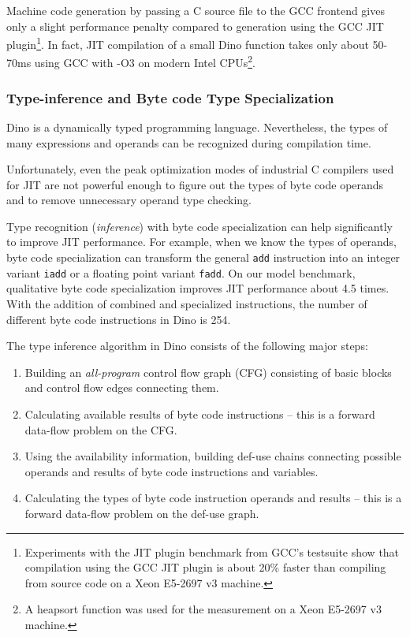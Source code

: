 \documentclass[preprint]{sigplanconf}
\begin{document}
Machine code generation by passing a C source file to the GCC frontend gives only a slight performance penalty compared to generation
using the GCC JIT plugin\footnote{Experiments with the JIT plugin benchmark from
  GCC's testsuite show that compilation using the GCC JIT plugin is about
  20\% faster than compiling from source code on a Xeon E5-2697 v3
  machine.}.  In fact, JIT compilation of a small Dino function takes only about
50-70ms using GCC with -O3 on modern Intel CPUs\footnote{A heapsort function
 was used for the measurement on a Xeon E5-2697 v3 machine.}.

\subsubsection{Type-inference and Byte code Type Specialization}

  Dino is a dynamically typed programming language.  Nevertheless, the types of
many expressions and operands can be recognized during compilation time.

  Unfortunately, even the peak optimization modes of industrial C compilers used for JIT are not powerful enough to figure out the types of
byte code operands and to remove unnecessary operand type checking.

  Type recognition (\emph{inference}) with byte code specialization
can help significantly to improve JIT performance.  For example,
when we know the types of operands,
byte code specialization can transform the general {\tt add} instruction
into an integer variant {\tt iadd} or a floating point
variant {\tt fadd}.  On our model benchmark,
qualitative
byte code specialization improves JIT performance about 4.5 times.
With the addition of combined and specialized instructions,
the number of different byte code instructions
in Dino is 254.

  The type inference algorithm in Dino consists of the following major steps:

\begin{enumerate}
     \item Building an \emph{all-program} control flow graph (CFG) consisting of basic blocks and control flow edges connecting them.
    \item Calculating available results of byte code instructions -- this is a forward data-flow problem on the CFG.
    \item Using the availability information, building def-use chains
connecting possible operands and results of byte code instructions and variables.
    \item Calculating the types of byte code instruction operands and results -- this is a forward data-flow problem on the def-use graph.
\end{enumerate}
\end{document}
